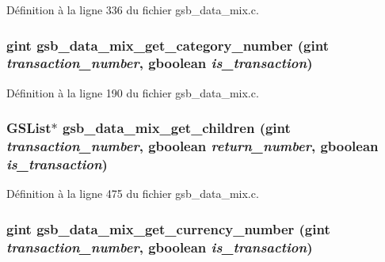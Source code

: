 Définition à la ligne 336 du fichier gsb\_\-data\_\-mix.c.

\subsubsection[{gsb\_\-data\_\-mix\_\-get\_\-category\_\-number}]{\setlength{\rightskip}{0pt plus 5cm}gint gsb\_\-data\_\-mix\_\-get\_\-category\_\-number (gint {\em transaction\_\-number}, \/  gboolean {\em is\_\-transaction})}\label{gsb__data__mix_8h_ac80ddad52ce85a6a444b717f4fa0dcd4}


Définition à la ligne 190 du fichier gsb\_\-data\_\-mix.c.

\subsubsection[{gsb\_\-data\_\-mix\_\-get\_\-children}]{\setlength{\rightskip}{0pt plus 5cm}GSList$\ast$ gsb\_\-data\_\-mix\_\-get\_\-children (gint {\em transaction\_\-number}, \/  gboolean {\em return\_\-number}, \/  gboolean {\em is\_\-transaction})}\label{gsb__data__mix_8h_ac42d68a2260ed0ac4bc59dc65d4475b4}


Définition à la ligne 475 du fichier gsb\_\-data\_\-mix.c.

\subsubsection[{gsb\_\-data\_\-mix\_\-get\_\-currency\_\-number}]{\setlength{\rightskip}{0pt plus 5cm}gint gsb\_\-data\_\-mix\_\-get\_\-currency\_\-number (gint {\em transaction\_\-number}, \/  gboolean {\em is\_\-transaction})}\label{gsb__data__mix_8h_ab20294d6e3c998c6ad5b05783b0f3f9e}


